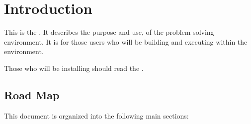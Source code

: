 %
%
%
%
%

%

\section{Introduction}
\label{sec:intro}


This is the \etitle{\srug}.  It describes the purpose and use, of the \sr{}
problem solving environment.  It is for those users who will be building
and executing  within the \sr{} environment.

Those who will be installing \sr{} should read the
\htmladdnormallinkfoot{\srig{}}{\installguideurl}.




\subsection{Road Map}
\label{sec:roadmap}

This document is organized into the following main sections:

